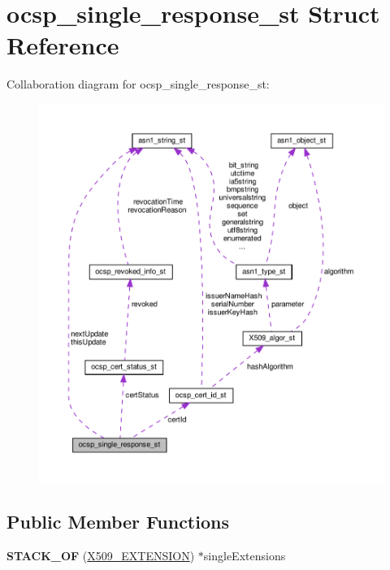 \hypertarget{structocsp__single__response__st}{}\section{ocsp\+\_\+single\+\_\+response\+\_\+st Struct Reference}
\label{structocsp__single__response__st}


Collaboration diagram for ocsp\+\_\+single\+\_\+response\+\_\+st\+:
\nopagebreak
\begin{figure}[H]
\begin{center}
\leavevmode
\includegraphics[width=350pt]{structocsp__single__response__st__coll__graph}
\end{center}
\end{figure}
\subsection*{Public Member Functions}
\begin{DoxyCompactItemize}
\item 
\mbox{\label{structocsp__single__response__st_a13e580cb5e59deb598f80513db57cefc}} 
{\bfseries S\+T\+A\+C\+K\+\_\+\+OF} (\hyperlink{structX509__extension__st}{X509\+\_\+\+E\+X\+T\+E\+N\+S\+I\+ON}) $\ast$single\+Extensions
\end{DoxyCompactItemize}
